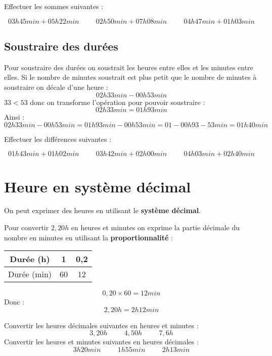 \documentclass[a4paper,dvipsnames]{article}
\begin{document}
\begin{ExOApp}[]
Effectuer les sommes suivantes :

\[03h45min+05h22min\hspace{1cm}02h50min+07h08min\hspace{1cm}04h47min+01h03min\]
\end{ExOApp}

\subsection{Soustraire des durées}

\begin{Mt}
Pour soustraire des durées on soustrait les heures entre elles et les minutes entre elles. Si le nombre de minutes soustrait est plus petit que le nombre de minutes à soustraire on décale d'une heure :
\[
02h33min-00h53min
\]
$33<53$ donc on transforme l'opération pour pouvoir soustraire :
\[02h33min=01h93min\]
Ainsi :
\[
02h33min-00h53min=01h93min-00h53min
=01-00h93-53min=01h40min
\]
\end{Mt}

\begin{ExOApp}[]
Effectuer les différences suivantes :

\[01h43min+01h02min\hspace{1cm}03h42min+02h00min\hspace{1cm}04h03min+02h40min\]
\end{ExOApp}

\section{Heure en système décimal}

\begin{Def}
On peut exprimer des heures en utilisant le \textbf{système décimal}.
\end{Def}

\begin{Mt}
Pour convertir $2,20h$ en heures et minutes on exprime la partie décimale du nombre en minutes en utilisant la \textbf{proportionnalité} :
\begin{tabular}{c||c|c}
Durée (h) & 1 & 0,2\\\hline
Durée (min) & 60 & 12\\
\end{tabular}
\[0,20\times60=12min\]
Donc :
\[2,20h=2h12min\]
\end{Mt}

\begin{ExOApp}[]
Convertir les heures décimales suivantes en heures et minutes :
\[3,20h\hspace{1cm}4,50h\hspace{1cm}7,6h\]
Convertir les heures et minutes suivantes en heures décimales :
\[3h20min\hspace{1cm}1h55min\hspace{1cm}2h13min\]
\end{ExOApp}
\end{document}
